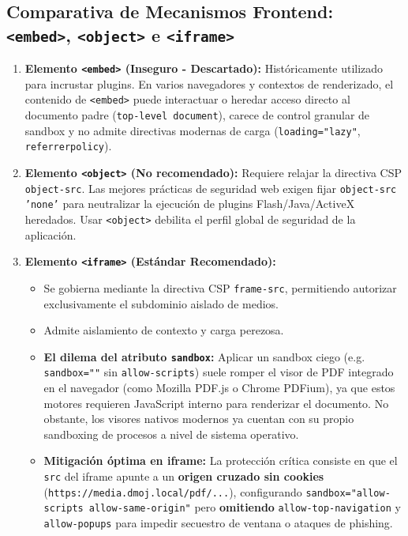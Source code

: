 \documentclass[11pt,a4paper]{article}
\begin{document}
\subsection{Comparativa de Mecanismos Frontend: \texttt{\textless embed\textgreater}, \texttt{\textless object\textgreater} e \texttt{\textless iframe\textgreater}}
\begin{enumerate}[leftmargin=*]
    \item \textbf{Elemento \texttt{\textless embed\textgreater} (Inseguro - Descartado):} Históricamente utilizado para incrustar plugins. En varios navegadores y contextos de renderizado, el contenido de \texttt{\textless embed\textgreater} puede interactuar o heredar acceso directo al documento padre (\texttt{top-level document}), carece de control granular de sandbox y no admite directivas modernas de carga (\texttt{loading="lazy"}, \texttt{referrerpolicy}).
    \item \textbf{Elemento \texttt{\textless object\textgreater} (No recomendado):} Requiere relajar la directiva CSP \texttt{object-src}. Las mejores prácticas de seguridad web exigen fijar \texttt{object-src 'none'} para neutralizar la ejecución de plugins Flash/Java/ActiveX heredados. Usar \texttt{\textless object\textgreater} debilita el perfil global de seguridad de la aplicación.
    \item \textbf{Elemento \texttt{\textless iframe\textgreater} (Estándar Recomendado):}
    \begin{itemize}
        \item Se gobierna mediante la directiva CSP \texttt{frame-src}, permitiendo autorizar exclusivamente el subdominio aislado de medios.
        \item Admite aislamiento de contexto y carga perezosa.
        \item \textbf{El dilema del atributo \texttt{sandbox}:} Aplicar un sandbox ciego (e.g. \texttt{sandbox=""} sin \texttt{allow-scripts}) suele romper el visor de PDF integrado en el navegador (como Mozilla PDF.js o Chrome PDFium), ya que estos motores requieren JavaScript interno para renderizar el documento. No obstante, los visores nativos modernos ya cuentan con su propio sandboxing de procesos a nivel de sistema operativo.
        \item \textbf{Mitigación óptima en iframe:} La protección crítica consiste en que el \texttt{src} del iframe apunte a un \textbf{origen cruzado sin cookies} (\texttt{https://media.dmoj.local/pdf/...}), configurando \texttt{sandbox="allow-scripts allow-same-origin"} pero \textbf{omitiendo} \texttt{allow-top-navigation} y \texttt{allow-popups} para impedir secuestro de ventana o ataques de phishing.
    \end{itemize}
\end{enumerate}
\end{document}
